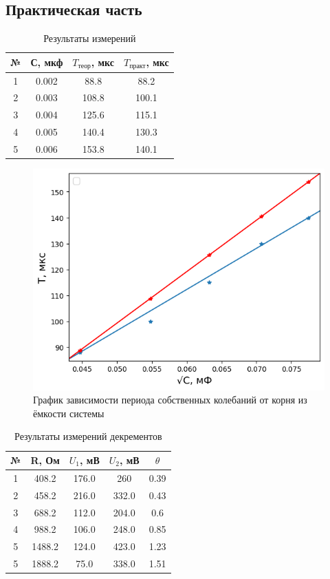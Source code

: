 \documentclass[
a4paper, %
12pt, %
]{article}
\begin{document}
	\subsection{Практическая часть}
	
	

	\begin{table}[h]
		\centering
		\begin{tabular}{|c|c|c|c|}
			\hline
			№ & С, мкф & $T_\text{теор}$, мкс & $T_\text{практ}$, мкс \\
			\hline
			1 & 0.002 & 88.8 & 88.2 \\
			\hline
			2 & 0.003 & 108.8 & 100.1 \\
			\hline
			3 & 0.004 & 125.6 & 115.1 \\
			\hline
			4 & 0.005 & 140.4 & 130.3 \\
			\hline
			5 & 0.006 & 153.8 & 140.1 \\
			\hline
		\end{tabular}
		\caption{Результаты измерений}
	\end{table}
	
	\begin{figure}[h]
		\centering
		\includegraphics[width=0.68\linewidth]{img/TsqrtC}
		\caption{График зависимости периода собственных колебаний от корня из ёмкости системы}
		\label{fig:tsqrtc}
	\end{figure}
	
	\begin{table}[h]
		\centering
		\begin{tabular}{|c|c|c|c|c|}
			\hline
			№ & R, Ом & $U_1$, мВ & $U_2$, мВ & $\theta$ \\
			\hline
			1 & 408.2 & 176.0 & 260 & 0.39 \\
			\hline
			2 & 458.2 & 216.0 & 332.0 & 0.43 \\
			\hline
			3 & 688.2 & 112.0 & 204.0 & 0.6 \\
			\hline
			4 & 988.2 & 106.0 & 248.0 & 0.85\\
			\hline
			5 & 1488.2 & 124.0 & 423.0 & 1.23\\
			\hline
			5 & 1888.2 & 75.0 & 338.0 & 1.51\\
			\hline
		\end{tabular}
		\caption{Результаты измерений декрементов}
	\end{table}
	
\end{document}
